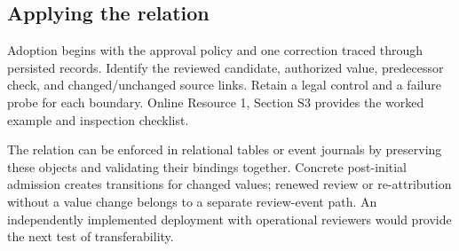 \subsection{Applying the relation}

Adoption begins with the approval policy and one correction traced through persisted records. Identify the reviewed candidate, authorized value, predecessor check, and changed/unchanged source links. Retain a legal control and a failure probe for each boundary. Online Resource 1, Section S3 provides the worked example and inspection checklist.

The relation can be enforced in relational tables or event journals by preserving these objects and validating their bindings together. Concrete post-initial admission creates transitions for changed values; renewed review or re-attribution without a value change belongs to a separate review-event path. An independently implemented deployment with operational reviewers would provide the next test of transferability.
